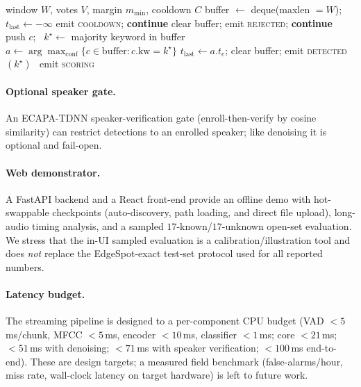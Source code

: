 \documentclass[10pt,twocolumn]{article}
\begin{document}
\begin{algorithm}[t]
\caption{Streaming decision state machine (smoothing $+$ cooldown).}
\label{alg:sm}
\footnotesize
\begin{algorithmic}[1]
\Require window $W$, votes $V$, margin $m_{\min}$, cooldown $C$
\State buffer $\gets$ deque(maxlen $=W$); \ $t_{\text{last}}\gets-\infty$
   \State emit \textsc{cooldown}; \textbf{continue} \EndIf
       \State clear buffer; emit \textsc{rejected}; \textbf{continue}
  \EndIf
  \State push $c$; \ $k^\star\gets$ majority keyword in buffer
     \State $a\gets\arg\max_{\text{conf}}\{c\in\text{buffer}:c.\text{kw}{=}k^\star\}$
     \State $t_{\text{last}}\gets a.t_e$; clear buffer; emit \textsc{detected}$(k^\star)$
  \Else\ \State emit \textsc{scoring} \EndIf
\EndFor
\end{algorithmic}
\end{algorithm}

\paragraph{Optional speaker gate.}
An ECAPA-TDNN speaker-verification gate (enroll-then-verify by cosine
similarity) can restrict detections to an enrolled speaker; like denoising it is
optional and fail-open.

\paragraph{Web demonstrator.}
A FastAPI backend and a React front-end provide an offline demo with
hot-swappable checkpoints (auto-discovery, path loading, and direct file
upload), long-audio timing analysis, and a sampled $17$-known/$17$-unknown
open-set evaluation. We stress that the in-UI sampled evaluation is a
calibration/illustration tool and does \emph{not} replace the EdgeSpot-exact
test-set protocol used for all reported numbers.

\paragraph{Latency budget.}
The streaming pipeline is designed to a per-component CPU budget (VAD
$<5$\,ms/chunk, MFCC $<5$\,ms, encoder $<10$\,ms, classifier $<1$\,ms; core
$<21$\,ms; $<51$\,ms with denoising; $<71$\,ms with speaker verification;
$<100$\,ms end-to-end). These are design targets; a measured field benchmark
(false-alarms/hour, miss rate, wall-clock latency on target hardware) is left to
future work.
\end{document}
